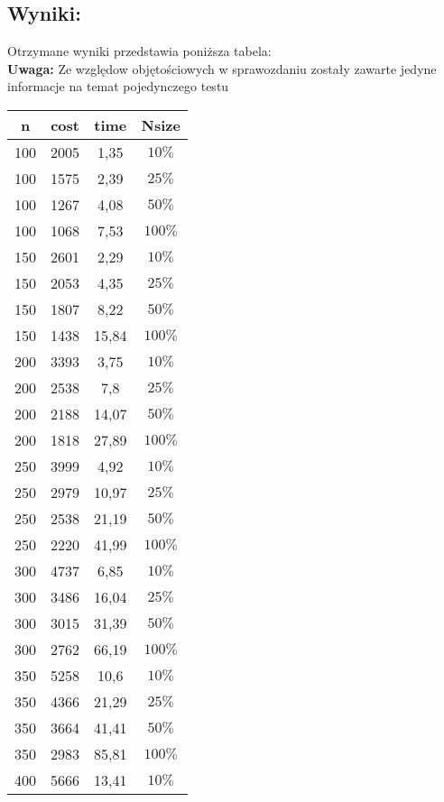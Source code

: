   \subsection{Wyniki: }
    Otrzymane wyniki przedstawia poniższa tabela: \\
    \textbf{Uwaga:} Ze względow objętościowych w sprawozdaniu zostały zawarte jedyne informacje na temat pojedynczego testu
    \begin{table}[H]
      \centering
      \begin{tabular}{||c c c c||} 
       \hline
       n & cost & time & Nsize \\ [0.5ex] 
       \hline\hline
        100 &	2005	& 1,35	& $10\%$ \\
        100	& 1575	& 2,39	& $25\%$ \\
        100	& 1267	& 4,08	& $50\%$ \\
        100 &	1068	& 7,53	& $100\%$ \\
        150 &	2601	& 2,29	& $10\%$ \\ 
        150 &	2053	& 4,35	& $25\%$ \\
        150 &	1807	& 8,22	& $50\%$ \\
        150 &	1438	& 15,84	& $100\%$ \\
        200 &	3393	& 3,75	& $10\%$ \\
        200 &	2538	& 7,8	& $25\%$ \\
        200 &	2188	& 14,07	& $50\%$ \\
        200	& 1818	& 27,89	& $100\%$ \\
        250	& 3999	& 4,92	& $10\%$ \\
        250	& 2979	& 10,97	& $25\%$ \\
        250	& 2538	& 21,19	& $50\%$ \\
        250	& 2220	& 41,99	& $100\%$ \\
        300	& 4737	& 6,85	& $10\%$ \\
        300	& 3486	& 16,04	& $25\%$ \\
        300	& 3015	& 31,39	& $50\%$ \\
        300	& 2762	& 66,19	& $100\%$ \\
        350	& 5258	& 10,6	& $10\%$ \\
        350	& 4366	& 21,29	& $25\%$ \\
        350	& 3664	& 41,41	& $50\%$ \\
        350	& 2983	& 85,81	& $100\%$ \\
        400	& 5666	& 13,41	& $10\%$ \\

\end{tabular}
\end{table}
